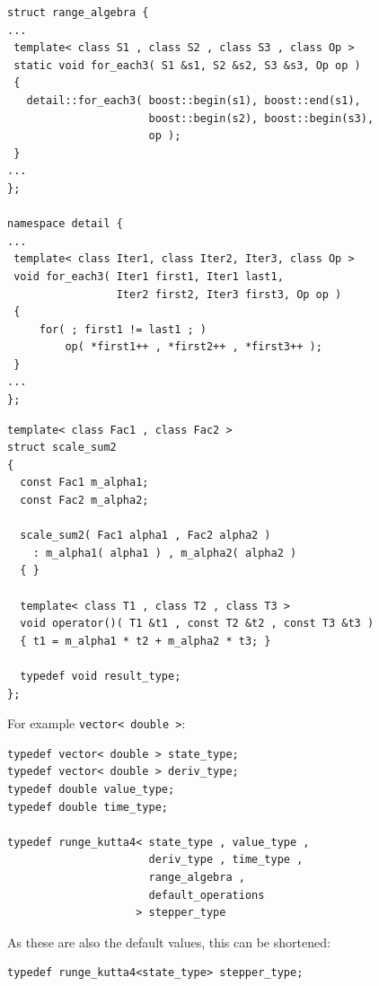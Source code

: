 \begin{frame}[fragile]

\begin{lstlisting}[basicstyle=\scriptsize\ttfamily]
struct range_algebra {
...
 template< class S1 , class S2 , class S3 , class Op >
 static void for_each3( S1 &s1, S2 &s2, S3 &s3, Op op )
 {
   detail::for_each3( boost::begin(s1), boost::end(s1),
                      boost::begin(s2), boost::begin(s3), 
                      op );
 }
...
};

namespace detail {
...
 template< class Iter1, class Iter2, Iter3, class Op >
 void for_each3( Iter1 first1, Iter1 last1, 
                 Iter2 first2, Iter3 first3, Op op )
 {
     for( ; first1 != last1 ; )
         op( *first1++ , *first2++ , *first3++ );
 }
...
};
\end{lstlisting}

\end{frame}


\begin{frame}[fragile]
\begin{lstlisting}
template< class Fac1 , class Fac2 >
struct scale_sum2
{
  const Fac1 m_alpha1;
  const Fac2 m_alpha2;

  scale_sum2( Fac1 alpha1 , Fac2 alpha2 ) 
    : m_alpha1( alpha1 ) , m_alpha2( alpha2 ) 
  { }

  template< class T1 , class T2 , class T3 >
  void operator()( T1 &t1 , const T2 &t2 , const T3 &t3 )
  { t1 = m_alpha1 * t2 + m_alpha2 * t3; }

  typedef void result_type;
};
\end{lstlisting}

\end{frame}

\begin{frame}[fragile]


For example \lstinline+vector< double >+:
\begin{lstlisting}
typedef vector< double > state_type;
typedef vector< double > deriv_type;
typedef double value_type;
typedef double time_type;

typedef runge_kutta4< state_type , value_type , 
                      deriv_type , time_type , 
                      range_algebra , 
                      default_operations 
                    > stepper_type
\end{lstlisting}

\vspace{1em}
As these are also the default values, this can be shortened:
\begin{lstlisting}
typedef runge_kutta4<state_type> stepper_type; 
\end{lstlisting}

\end{frame}


